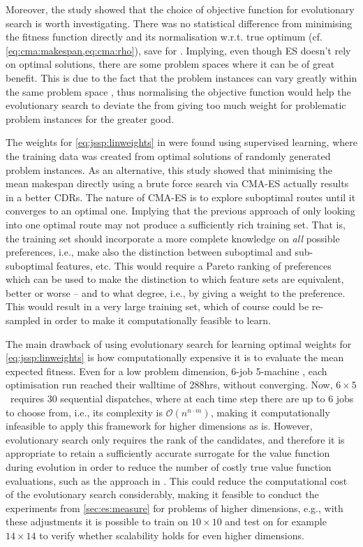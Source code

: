 Moreover, the study showed that the choice of objective function  for evolutionary search is worth investigating. There was no statistical difference from minimising the fitness function directly and its normalisation w.r.t. true optimum (cf. \cref{eq:cma:makespan,eq:cma:rho}), save for . Implying, even though ES doesn't rely on optimal solutions, there are some problem spaces where it can be of great benefit. This is due to the fact that the problem instances can vary greatly within the same problem space \cite{InRu12}, thus normalising the objective function would help the evolutionary search to deviate the from giving too much weight for problematic problem instances for the greater good.

The weights for \cref{eq:jssp:linweights} in \cite{InRu11a} were found using supervised learning, where the training data was created from optimal solutions of randomly generated problem instances. As an alternative, this study showed  that minimising the mean makespan directly using a brute force search via CMA-ES actually results in a better CDRs. The nature of CMA-ES is to explore suboptimal routes until it converges to an optimal one. Implying that the previous approach of only looking into one optimal route may not produce a sufficiently rich training set. That is, the training set should incorporate a more complete knowledge on \emph{all} possible preferences, i.e., make also the distinction between suboptimal and sub-suboptimal features, etc.  This would require a Pareto ranking of preferences which can be used to make the distinction to which feature sets are equivalent, better or worse -- and to what degree, i.e., by giving a weight to the preference. This would result in a very large training set, which of course could be re-sampled in order to make it computationally feasible to learn.

The main drawback of using evolutionary search for learning optimal weights for \cref{eq:jssp:linweights} is how computationally expensive it is to evaluate the mean expected fitness. Even for a low problem dimension, 6-job 5-machine \JSP , each optimisation run reached their walltime of 288hrs, without converging. Now, $6\times5$ \JSP\ requires 30 sequential dispatches, where at each time step there are up to $6$ jobs to choose from, i.e., its complexity is $\mathcal{O}(n^{n\cdot m})$, making it computationally infeasible to apply this framework for higher dimensions as is. 
However, evolutionary search only requires the rank of the candidates, and therefore it is appropriate to retain a sufficiently accurate surrogate for the value function during evolution in order to reduce the number of costly true value function evaluations, such as the approach in \cite{InRu11b}. This could reduce the computational cost of the evolutionary search considerably, making it feasible to conduct the experiments from \cref{sec:es:measure} for problems of higher dimensions, e.g., with these adjustments it is possible to train on $10\times10$ and test on for example $14\times14$ to verify whether scalability holds for even higher dimensions.  





